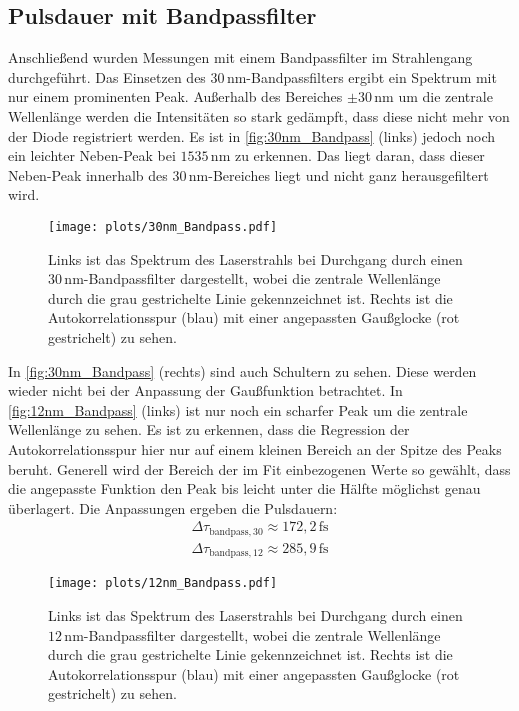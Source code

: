 \subsection{Pulsdauer mit Bandpassfilter}
    Anschließend wurden Messungen mit einem Bandpassfilter im Strahlengang durchgeführt.
    Das Einsetzen des $30\,\si{\nano\meter}$-Bandpassfilters ergibt ein Spektrum mit nur einem prominenten Peak.
    Außerhalb des Bereiches $\pm30\,\si{\nano\meter}$ um die zentrale Wellenlänge werden die Intensitäten so stark gedämpft, dass diese nicht mehr von der Diode registriert werden.
    Es ist in \autoref{fig:30nm_Bandpass} (links) jedoch noch ein leichter Neben-Peak bei $1535\,\si{\nano\meter}$ zu erkennen.
    Das liegt daran, dass dieser Neben-Peak innerhalb des $30\,\si{\nano\meter}$-Bereiches liegt und nicht ganz herausgefiltert wird.    
    \vspace*{-0.3cm}
    \begin{figure}[ht]
        \centering\captionsetup{format=plain}
        \texttt{[image: plots/30nm\_Bandpass.pdf]} \vspace*{-0.5cm}
        \caption{Links ist das Spektrum des Laserstrahls bei Durchgang durch einen $30\,\si{\nano\meter}$-Bandpassfilter dargestellt, wobei die zentrale Wellenlänge durch die grau gestrichelte Linie gekennzeichnet ist. Rechts ist die Autokorrelationsspur (blau) mit einer angepassten Gaußglocke (rot gestrichelt) zu sehen.}
        \label{fig:30nm_Bandpass}
    \end{figure}
    \FloatBarrier
    In \autoref{fig:30nm_Bandpass} (rechts) sind auch Schultern zu sehen.
    Diese werden wieder nicht bei der Anpassung der Gaußfunktion betrachtet.
    In \autoref{fig:12nm_Bandpass} (links) ist nur noch ein scharfer Peak um die zentrale Wellenlänge zu sehen.
    Es ist zu erkennen, dass die Regression der Autokorrelationsspur hier nur auf einem kleinen Bereich an der Spitze des Peaks beruht.
    Generell wird der Bereich der im Fit einbezogenen Werte so gewählt, dass die angepasste Funktion den Peak bis leicht unter die Hälfte möglichst genau überlagert.
    Die Anpassungen ergeben die Pulsdauern:
    \begin{align*}
        \Delta \tau_{\mathrm{bandpass,30}} \approx 172,2\,\si{\femto\second} \\
        \Delta \tau_{\mathrm{bandpass,12}} \approx 285,9\,\si{\femto\second}
    \end{align*}
    \begin{figure}[ht]
        \centering\captionsetup{format=plain}\vspace*{-1cm}
        \texttt{[image: plots/12nm\_Bandpass.pdf]} \vspace*{-0.5cm}
        \caption{Links ist das Spektrum des Laserstrahls bei Durchgang durch einen $12\,\si{\nano\meter}$-Bandpassfilter dargestellt, wobei die zentrale Wellenlänge durch die grau gestrichelte Linie gekennzeichnet ist. Rechts ist die Autokorrelationsspur (blau) mit einer angepassten Gaußglocke (rot gestrichelt) zu sehen.}
        \label{fig:12nm_Bandpass}
    \end{figure}
    \FloatBarrier

